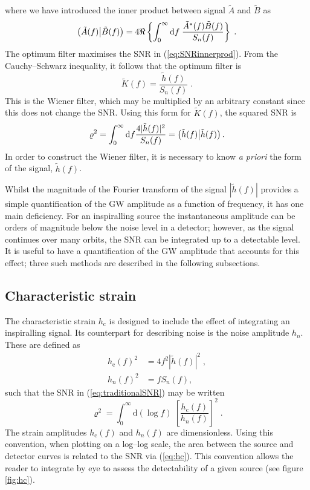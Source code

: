 where we have introduced the inner product between signal $\tilde{A}$ and $\tilde{B}$ as \citep{Finn1992}
\begin{equation}\label{eq:snrinnerprod} \left({\tilde{A}(f)}\middle|{\tilde{B}(f)}\right) = 4\Re\left\{\int_{0}^{\infty}\mathrm{d}f\;\frac{\tilde{A}^{*}(f)\tilde{B}(f)}{S_{n}(f)}\right\} \; .\end{equation}
The optimum filter maximises the SNR in (\ref{eq:SNRinnerprod}). From the Cauchy--Schwarz inequality, it follows that the optimum filter is
\begin{equation}
\tilde{K}(f)=\frac{\tilde{h}(f)}{S_{n}(f)} \; .
\end{equation}
This is the Wiener filter, which may be multiplied by an arbitrary constant since this does not change the SNR. Using this form for $\tilde{K}(f)$, the squared SNR is
\begin{equation}
\varrho^2 = \int_0^\infty\mathrm{d}f \frac{4| \tilde{h}(f)|^{2}}{S_n(f)} = \left({\tilde{h}(f)}\middle|{\tilde{h}(f)}\right).
\label{eq:traditionalSNR} 
\end{equation}
In order to construct the Wiener filter, it is necessary to know \emph{a priori} the form of the signal, $\tilde{h}(f)$.

Whilst the magnitude of the Fourier transform of the signal $|\tilde{h}(f)|$ provides a simple quantification of the GW amplitude as a function of frequency, it has one main deficiency. For an inspiralling source the instantaneous amplitude can be orders of magnitude below the noise level in a detector; however, as the signal continues over many orbits, the SNR can be integrated up to a detectable level. It is useful to have a quantification of the GW amplitude that accounts for this effect; three such methods are described in the following subsections.

\subsection{Characteristic strain}\label{sec:character-strain}

The characteristic strain $h_\mathrm{c}$ is designed to include the effect of integrating an inspiralling signal. Its counterpart for describing noise is the noise amplitude $h_n$. These are defined as
\begin{eqnarray}\label{eq:strain-hc} 
h_\mathrm{c}(f)^{2} &= 4f^{2}\left| \tilde{h}(f) \right|^{2} \; ,\\
h_{n}(f)^{2} &= fS_{n}(f),
\label{eq:strain-hn}
\end{eqnarray}
such that the SNR in (\ref{eq:traditionalSNR}) may be written
\begin{equation}\label{eq:hc} 
\varrho^{2} = \int_{0}^{\infty} \mathrm{d}\left(\log f\right)\; \left[\frac{h_\mathrm{c}(f)}{h_{n}(f)}\right]^{2} \;.
\end{equation}
The strain amplitudes $h_\mathrm{c}(f)$ and $h_{n}(f)$ are dimensionless. Using this convention, when plotting on a log--log scale, the area between the source and detector curves is related to the SNR via (\ref{eq:hc}). This convention allows the reader to integrate by eye to assess the detectability of a given source (see figure \ref{fig:hc}).


